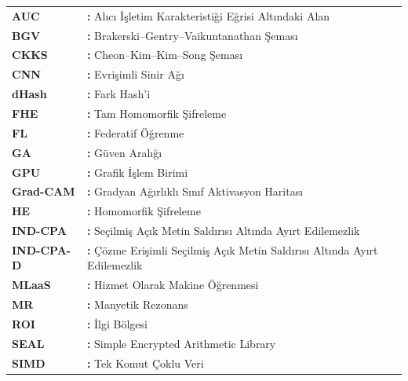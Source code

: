 \hspace{-3mm}
\begin{tabular}{p{3cm}l}
{\bf AUC} & {\bf:} Alıcı İşletim Karakteristiği Eğrisi Altındaki Alan\\
{\bf BGV} & {\bf:} Brakerski–Gentry–Vaikuntanathan Şeması\\
{\bf CKKS} & {\bf:} Cheon–Kim–Kim–Song Şeması\\
{\bf CNN} & {\bf:} Evrişimli Sinir Ağı\\
{\bf dHash} & {\bf:} Fark Hash'i\\
{\bf FHE} & {\bf:} Tam Homomorfik Şifreleme\\
{\bf FL} & {\bf:} Federatif Öğrenme\\
{\bf GA} & {\bf:} Güven Aralığı\\
{\bf GPU} & {\bf:} Grafik İşlem Birimi\\
{\bf Grad-CAM} & {\bf:} Gradyan Ağırlıklı Sınıf Aktivasyon Haritası\\
{\bf HE} & {\bf:} Homomorfik Şifreleme\\
{\bf IND-CPA} & {\bf:} Seçilmiş Açık Metin Saldırısı Altında Ayırt Edilemezlik\\
{\bf IND-CPA-D} & {\bf:} Çözme Erişimli Seçilmiş Açık Metin Saldırısı Altında Ayırt Edilemezlik\\
{\bf MLaaS} & {\bf:} Hizmet Olarak Makine Öğrenmesi\\
{\bf MR} & {\bf:} Manyetik Rezonans\\
{\bf ROI} & {\bf:} İlgi Bölgesi\\
{\bf SEAL} & {\bf:} Simple Encrypted Arithmetic Library\\
{\bf SIMD} & {\bf:} Tek Komut Çoklu Veri\\
\end{tabular}
